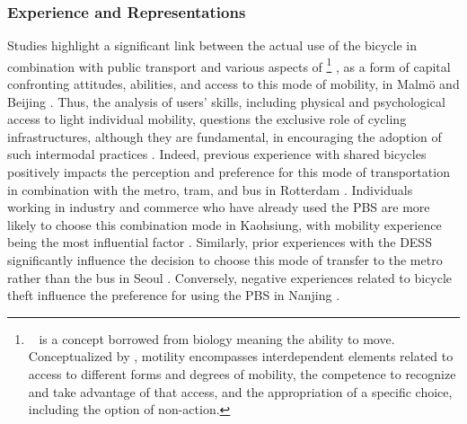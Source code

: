 \begin{refsegment}
\subsubsection*{Experience and Representations
    \label{chap2:experience-representations}
    }
    
Studies highlight a significant link between the actual use of the bicycle in combination with public transport and various aspects of \footnote{~
     is a concept borrowed from biology meaning the ability to move. Conceptualized by \textcolor{blue}{\textcite[750]{kaufmann_motility_2004}}, motility encompasses interdependent elements related to access to different forms and degrees of mobility, the competence to recognize and take advantage of that access, and the appropriation of a specific choice, including the option of non-action.
} \textcolor{blue}{\autocite[750]{kaufmann_motility_2004}}, as a form of capital confronting attitudes, abilities, and access to this mode of mobility, in Malmö and Beijing \textcolor{blue}{\autocite[7-15]{hamidi_shaping_2020}}. Thus, the analysis of users' skills, including physical and psychological access to light individual mobility, questions the exclusive role of cycling infrastructures, although they are fundamental, in encouraging the adoption of such intermodal practices \textcolor{blue}{\autocite[686]{hamidi_inequalities_2019}}. Indeed, previous experience with shared bicycles positively impacts the perception and preference for this mode of transportation in combination with the metro, tram, and bus in Rotterdam \textcolor{blue}{\autocite[6]{montes_shared_2023}}. Individuals working in industry and commerce who have already used the \acrshort{PBS} are more likely to choose this combination mode in Kaohsiung, with mobility experience being the most influential factor \textcolor{blue}{\autocite[24]{cheng_expanding_2018}}. Similarly, prior experiences with the \acrshort{DESS} significantly influence the decision to choose this mode of transfer to the metro rather than the bus in Seoul \textcolor{blue}{\autocite[9]{baek_electric_2021}}. Conversely, negative experiences related to bicycle theft influence the preference for using the \acrshort{PBS} in Nanjing \textcolor{blue}{\autocite[19]{ji_public_2017}}.%


\end{refsegment}
